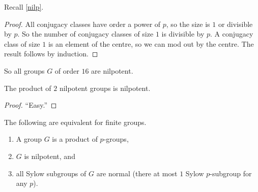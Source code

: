 \documentclass[11pt, twoside]{amsart}
\begin{document}
Recall \cref{nilp}. 
\begin{proof}
All conjugacy classes have order a power of $p$, so the size is $1$ or divisible by $p$. So the number of conjugacy classes of size $1$ is divisible by $p$. A conjugacy class of size $1$ is an element of the centre, so we can mod out by the centre. The result follows by induction. 
\end{proof}
So all groups $G$ of order $16$ are nilpotent.
\begin{proposition}
The product of $2$ nilpotent groups is nilpotent. 
\end{proposition}
\begin{proof}
``Easy.''
\end{proof}
\begin{proposition}
The following are equivalent for finite groups. 
\begin{enumerate}
\item A group $G$ is a product of $p$-groups,
\item $G$ is nilpotent, and
\item all Sylow subgroups of $G$ are normal (there at most $1$ Sylow $p$-subgroup for any $p$).
\end{enumerate}
\end{proposition}
%
\end{document}
